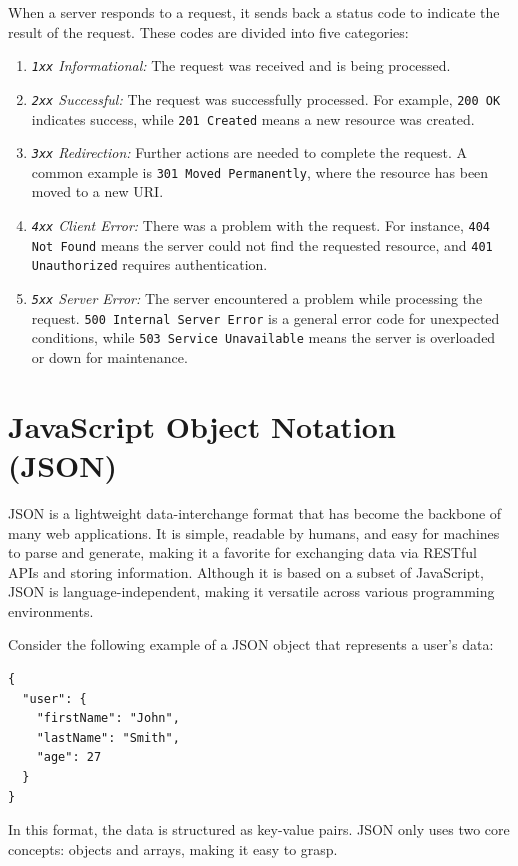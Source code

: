 When a server responds to a request, it sends back a status code to indicate the result of the request. These codes are divided into five categories:
\begin{enumerate}
    \item \textit{\texttt{1xx} Informational:} The request was received and is being processed.
    \item \textit{\texttt{2xx} Successful:} The request was successfully processed. For example, \texttt{200 OK} indicates success, while \texttt{201 Created} means a new resource was created.
    \item \textit{\texttt{3xx} Redirection:} Further actions are needed to complete the request. A common example is \texttt{301 Moved Permanently}, where the resource has been moved to a new URI.
    \item \textit{\texttt{4xx} Client Error:} There was a problem with the request. For instance, \texttt{404 Not Found} means the server could not find the requested resource, and \texttt{401 Unauthorized} requires authentication.
    \item \textit{\texttt{5xx} Server Error:} The server encountered a problem while processing the request. \texttt{500 Internal Server Error} is a general error code for unexpected conditions, while \texttt{503 Service Unavailable} means the server is overloaded or down for maintenance.
\end{enumerate}

\section{JavaScript Object Notation (JSON)}
JSON is a lightweight data-interchange format that has become the backbone of many web applications. It is simple, readable by humans, and easy for machines to parse and generate, making it a favorite for exchanging data via RESTful APIs and storing information. Although it is based on a subset of JavaScript, JSON is language-independent, making it versatile across various programming environments.

Consider the following example of a JSON object that represents a user's data:
\begin{lstlisting}
{
  "user": {
    "firstName": "John",
    "lastName": "Smith",
    "age": 27
  }
}
\end{lstlisting}
In this format, the data is structured as key-value pairs. JSON only uses two core concepts: objects and arrays, making it easy to grasp.

